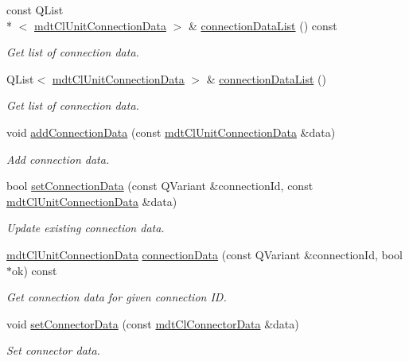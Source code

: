 \begin{DoxyCompactItemize}
const Q\-List\\*
$<$ \hyperlink{classmdt_cl_unit_connection_data}{mdt\-Cl\-Unit\-Connection\-Data} $>$ \& \hyperlink{classmdt_cl_unit_connector_data_a10ea3c0102f56aa77d6a1b7ffa30151b}{connection\-Data\-List} () const 
\begin{DoxyCompactList}\small\item\em Get list of connection data. \end{DoxyCompactList}\item 
Q\-List$<$ \hyperlink{classmdt_cl_unit_connection_data}{mdt\-Cl\-Unit\-Connection\-Data} $>$ \& \hyperlink{classmdt_cl_unit_connector_data_ad755cd666838422309013a520df98352}{connection\-Data\-List} ()
\begin{DoxyCompactList}\small\item\em Get list of connection data. \end{DoxyCompactList}\item 
void \hyperlink{classmdt_cl_unit_connector_data_a6129c9065b7be402650ae7ec10f0f185}{add\-Connection\-Data} (const \hyperlink{classmdt_cl_unit_connection_data}{mdt\-Cl\-Unit\-Connection\-Data} \&data)
\begin{DoxyCompactList}\small\item\em Add connection data. \end{DoxyCompactList}\item 
bool \hyperlink{classmdt_cl_unit_connector_data_a120e62edfba826f8221bb4e29a0c5da3}{set\-Connection\-Data} (const Q\-Variant \&connection\-Id, const \hyperlink{classmdt_cl_unit_connection_data}{mdt\-Cl\-Unit\-Connection\-Data} \&data)
\begin{DoxyCompactList}\small\item\em Update existing connection data. \end{DoxyCompactList}\item 
\hyperlink{classmdt_cl_unit_connection_data}{mdt\-Cl\-Unit\-Connection\-Data} \hyperlink{classmdt_cl_unit_connector_data_afae98e4e29b14763cd2dec917d379f98}{connection\-Data} (const Q\-Variant \&connection\-Id, bool $\ast$ok) const 
\begin{DoxyCompactList}\small\item\em Get connection data for given connection I\-D. \end{DoxyCompactList}\item 
void \hyperlink{classmdt_cl_unit_connector_data_af7530002a396d3e200fa0e3ab7cb1185}{set\-Connector\-Data} (const \hyperlink{classmdt_cl_connector_data}{mdt\-Cl\-Connector\-Data} \&data)
\begin{DoxyCompactList}\small\item\em Set connector data. \end{DoxyCompactList}\item 

\end{DoxyCompactItemize}
